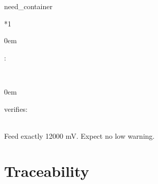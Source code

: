 \documentclass[a4paper,10pt,english]{sphinxmanual}
\begin{document}
\begin{sphinxuseclass}{need_container}

\begin{savenotes}\sphinxattablestart
\sphinxthistablewithglobalstyle
\centering
{}\label{\detokenize{requirements/tests:TC_LOW_EDGE}}\nobreak
\begin{tabular}[t]{*{1}{}}
\sphinxtoprule
\sphinxtableatstartofbodyhook
\begin{DUlineblock}{0em}
\item[] :     
\end{DUlineblock}
\\
\sphinxhline
\begin{DUlineblock}{0em}
\item[] \item[] 

\item[] \item[] verifies: 

\end{DUlineblock}
\\
\sphinxhline
\sphinxAtStartPar
Feed exactly 12000 mV. Expect no low warning.
\\
\sphinxbottomrule
\end{tabular}
\sphinxtableafterendhook\par
\sphinxattableend\end{savenotes}

\end{sphinxuseclass}
\sphinxstepscope


\chapter{Traceability}
\label{\detokenize{traceability:traceability}}\label{\detokenize{traceability::doc}}
\end{document}
